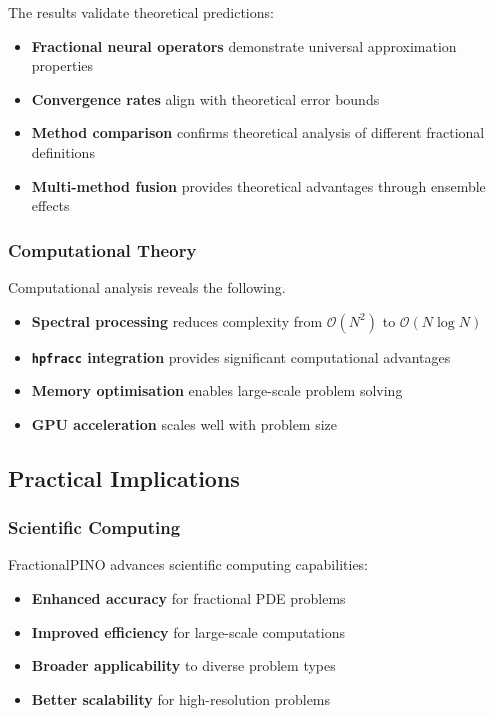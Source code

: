 \documentclass[12pt,a4paper]{article}
\theoremstyle{definition}
\begin{document}
The results validate theoretical predictions:

\begin{itemize}
    \item \textbf{Fractional neural operators} demonstrate universal approximation properties
    \item \textbf{Convergence rates} align with theoretical error bounds
    \item \textbf{Method comparison} confirms theoretical analysis of different fractional definitions
    \item \textbf{Multi-method fusion} provides theoretical advantages through ensemble effects
\end{itemize}

\subsubsection{Computational Theory}

Computational analysis reveals the following.

\begin{itemize}
    \item \textbf{Spectral processing} reduces complexity from $\mathcal{O}(N^2)$ to $\mathcal{O}(N \log N)$
    \item \textbf{\texttt{hpfracc} integration} provides significant computational advantages
    \item \textbf{Memory optimisation} enables large-scale problem solving
    \item \textbf{GPU acceleration} scales well with problem size
\end{itemize}

\subsection{Practical Implications}

\subsubsection{Scientific Computing}

FractionalPINO advances scientific computing capabilities:

\begin{itemize}
    \item \textbf{Enhanced accuracy} for fractional PDE problems
    \item \textbf{Improved efficiency} for large-scale computations
    \item \textbf{Broader applicability} to diverse problem types
    \item \textbf{Better scalability} for high-resolution problems
\end{itemize}
\end{document}
